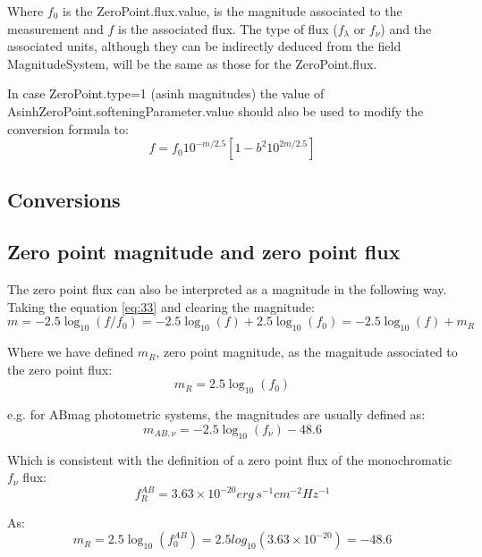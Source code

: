 \documentclass[11pt,a4paper]{ivoa}
\begin{document}
Where $f_0$ is the ZeroPoint.flux.value, is the magnitude associated to the
measurement and $f$ is the associated flux. The type of flux ($f_\lambda $ or $f_\nu $)
and the associated units, although they can be indirectly deduced from the field
MagnitudeSystem, will be the same as those for the ZeroPoint.flux.
\par
In case ZeroPoint.type=1 (asinh magnitudes) the value of
AsinhZeroPoint.softeningParameter.value should also be used to modify the conversion
formula to:
\begin{equation} \label{eq:34}
f = f_0 10^{-m/2.5}\left[ 1 - b^2 10^{2m/2.5}\right]
\end{equation}

\begin{appendices}
\section{Conversions}
\subsection{Zero point magnitude and zero point flux} \label{a.1conversion}
The zero point flux can also be interpreted as a magnitude in the following way.
Taking the equation \ref{eq:33} and clearing the magnitude:
\begin{equation} \label{eq:35}
m=-2.5\log_{10}(f/f_0 )=-2.5\log_{10}(f)+2.5\log_{10}(f_0 )=-2.5\log_{10} (f)+m_R
\end{equation}

Where we have defined $m_R$, zero point magnitude, as the magnitude associated to
the zero point flux:
\begin{equation} \label{eq:36}
m_R = 2.5\log_{10} (f_0 )
\end{equation}

e.g. for ABmag photometric systems, the magnitudes are usually defined as:
\begin{equation} \label{eq:37}
m_{AB,\nu } = -2.5\log_{10} (f_\nu ) - 48.6
\end{equation}

Which is consistent with the definition of a zero point flux of the
monochromatic $f_\nu $ flux:
\begin{equation} \label{eq:38}
f_{R}^{AB}=3.63 \times 10^{-20} erg\, s^{-1} cm^{-2} Hz^{-1}
\end{equation}

As:
\begin{equation} \label{eq:39}
m_R = 2.5\log_{10} (f_{0}^{AB})=2.5 log_10(3.63\times 10^{-20})=-48.6
\end{equation}


\end{appendices}
\end{document}
